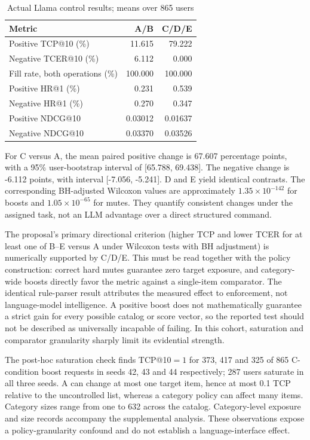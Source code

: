 \documentclass[conference]{IEEEtran}
\newcommand{\toprule}{\hline}
\newcommand{\midrule}{\hline}
\newcommand{\bottomrule}{\hline}
\begin{document}
\begin{table}[t]
\caption{Actual Llama control results; means over 865 users}
\label{tab:controls}
\centering\small
\begin{tabular}{@{}lrr@{}}
\toprule
Metric & A/B & C/D/E\\\midrule
Positive TCP@10 (\%) & 11.615 & 79.222\\
Negative TCER@10 (\%) & 6.112 & 0.000\\
Fill rate, both operations (\%) & 100.000 & 100.000\\
Positive HR@1 (\%) & 0.231 & 0.539\\
Negative HR@1 (\%) & 0.270 & 0.347\\
Positive NDCG@10 & 0.03012 & 0.01637\\
Negative NDCG@10 & 0.03370 & 0.03526\\\bottomrule
\end{tabular}
\end{table}

For C versus A, the mean paired positive change is 67.607 percentage points, with a 95\% user-bootstrap interval of [65.788, 69.438]. The negative change is -6.112 points, with interval [-7.056, -5.241]. D and E yield identical contrasts. The corresponding BH-adjusted Wilcoxon values are approximately $1.35\times10^{-142}$ for boosts and $1.05\times10^{-65}$ for mutes. They quantify consistent changes under the assigned task, not an LLM advantage over a direct structured command.

The proposal's primary directional criterion (higher TCP and lower TCER for at least one of B--E versus A under Wilcoxon tests with BH adjustment) is numerically supported by C/D/E. This must be read together with the policy construction: correct hard mutes guarantee zero target exposure, and category-wide boosts directly favor the metric against a single-item comparator. The identical rule-parser result attributes the measured effect to enforcement, not language-model intelligence. A positive boost does not mathematically guarantee a strict gain for every possible catalog or score vector, so the reported test should not be described as universally incapable of failing. In this cohort, saturation and comparator granularity sharply limit its evidential strength.

The post-hoc saturation check finds TCP@10$=1$ for 373, 417 and 325 of 865 C-condition boost requests in seeds 42, 43 and 44 respectively; 287 users saturate in all three seeds. A can change at most one target item, hence at most 0.1 TCP relative to the uncontrolled list, whereas a category policy can affect many items. Category sizes range from one to 632 across the catalog. Category-level exposure and size records accompany the supplemental analysis. These observations expose a policy-granularity confound and do not establish a language-interface effect.
\end{document}
